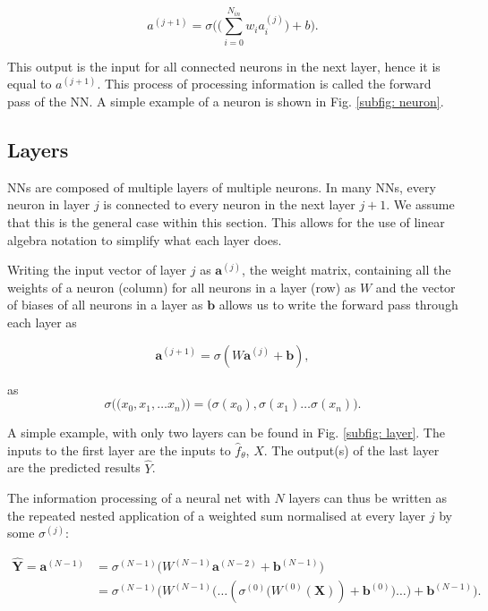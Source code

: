         \begin{equation}
            \label{eq: feed forward}
            a^{(j + 1)} = \sigma\bigg(\big(\sum_{i = 0}^{N_{in}} w_i a_i^{(j)}\big) + b\bigg).
        \end{equation}
        
        This output is the input for all connected neurons in the next layer, hence it is equal to $a^{(j+1)}$. This process of processing information is called the forward pass of the NN. A simple example of a neuron is shown in Fig. \ref{subfig: neuron}.
    
    \subsection{Layers}
        NNs are composed of multiple layers of multiple neurons. In many NNs, every neuron in layer $j$ is connected to every neuron in the next layer $j + 1$. We assume that this is the general case within this section. This allows for the use of linear algebra notation to simplify what each layer does.
        
        Writing the input vector of layer $j$ as $\mathbf{a}^{(j)}$, the weight matrix, containing all the weights of a neuron (column) for all neurons in a layer (row) as $W$ and the vector of biases of all neurons in a layer as $\mathbf{b}$ allows us to write the forward pass through each layer as
        
        \begin{equation}
            \mathbf{a}^{(j + 1)} = \sigma(W\mathbf{a}^{(j)} + \mathbf{b}),
        \end{equation}
        
        as \[
            \sigma\bigg( \big(x_0, x_1, \dots x_n) \bigg) = \bigg( \sigma(x_0), \sigma(x_1) \dots \sigma(x_n)\bigg). %
        \]
        
        A simple example, with only two layers can be found in Fig. \ref{subfig: layer}. The inputs to the first layer are the inputs to $\hat{f}_\theta$, $X$. The output(s) of the last layer are the predicted results $\hat{Y}$. 
        
        The information processing of a neural net with $N$ layers can thus be written as the repeated nested application of a weighted sum normalised at every layer $j$ by some $\sigma^{(j)}$:
        
        \begin{align}
            \label{eq: nested NN}
            \hat{\mathbf{Y}} = \mathbf{a}^{(N - 1)} &= \sigma^{(N-1)}\bigg(W^{(N - 1)}\mathbf{a}^{(N - 2)} + \mathbf{b}^{(N-1)}\bigg) \\
            &= \sigma^{(N-1)}\bigg(
                W^{(N - 1)}\big( \dots (
                \sigma^{(0)} \big(
                    W^{(0)} (\mathbf{X})) + \mathbf{b}^{(0)}
                    \big) \dots
                \big) + \mathbf{b}^{(N-1)} \nonumber
            \bigg).
        \end{align}
        
